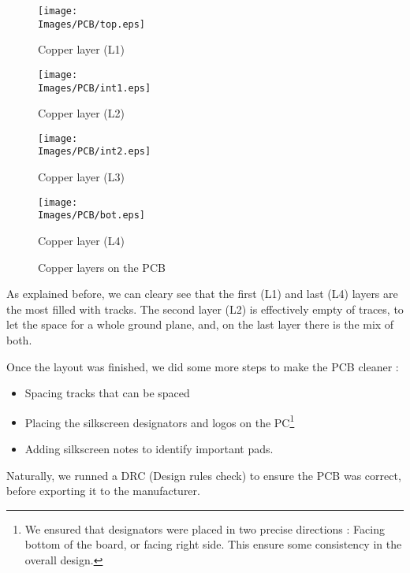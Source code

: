\begin{figure}[!hbt]
    \centering
    \begin{minipage}[c]{\SmallSchematicWidth}
        \centering
        \texttt{[image: \\Images/PCB/top.eps]}
        \caption*{Copper layer (L1)}
    \end{minipage}%
    \hfill%
    \begin{minipage}[c]{\SmallSchematicWidth}
        \centering
        \texttt{[image: \\Images/PCB/int1.eps]}
        \caption*{Copper layer (L2)}
    \end{minipage}%
    \hfill%
    \begin{minipage}[c]{\SmallSchematicWidth}
        \centering
        \texttt{[image: \\Images/PCB/int2.eps]}
        \caption*{Copper layer (L3)}
    \end{minipage}%
    \hfill%
    \begin{minipage}[c]{\SmallSchematicWidth}
        \centering
        \texttt{[image: \\Images/PCB/bot.eps]}
        \caption*{Copper layer (L4)}
    \end{minipage}
    \label{img:layout}
    \caption{Copper layers on the PCB}
\end{figure}
\FloatBarrier

As explained before, we can cleary see that the first (L1) and last (L4) layers
are the most filled with tracks. The second layer (L2) is effectively empty of
traces, to let the space for a whole ground plane, and, on the last layer there
is the mix of both.

Once the layout was finished, we did some more steps to make the PCB cleaner :

\begin{itemize}
    \item   Spacing tracks that can be spaced
    \item   Placing the silkscreen designators and logos on the PC\footnote{
              We ensured that designators were placed in two precise directions :
              Facing bottom of the board, or facing right side. This ensure some
              consistency in the overall design.
          }
    \item   Adding silkscreen notes to identify important pads.
\end{itemize}

Naturally, we runned a DRC (Design rules check) to ensure the PCB was correct, before
exporting it to the manufacturer.